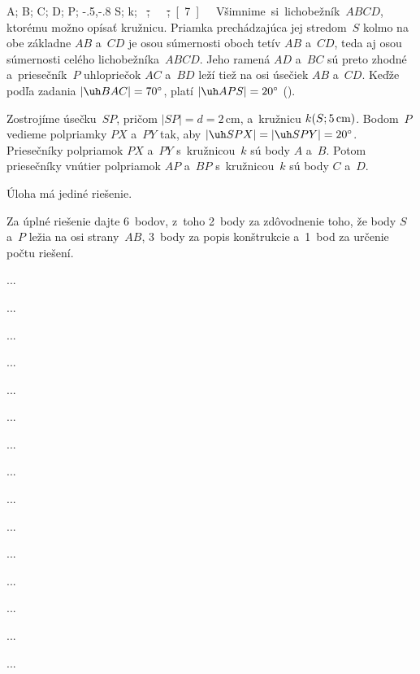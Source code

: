 {%
\fontplace
\trpoint A; \tlpoint B; \blpoint C; \brpoint D;
\lpoint P; \lpoint\xy-.5,-.8 S; \rBpoint k;
\cpoint\down\unit{}\st; \cpoint{}\st;
[7] \hfil\Obr

Všimnime si lichobežník~$ABCD$, ktorému možno opísať kružnicu. Priamka
prechádzajúca jej stredom~$S$ kolmo na obe základne $AB$ a~$CD$ je
osou súmernosti oboch tetív $AB$ a~$CD$, teda aj osou súmernosti
celého lichobežníka~$ABCD$. Jeho ramená $AD$ a~$BC$ sú preto
zhodné a~priesečník~$P$ uhlopriečok $AC$ a~$BD$ leží tiež na osi
úsečiek $AB$ a~$CD$. Keďže podľa zadania $|\uh BAC|=70^\circ$,
platí $|\uh APS|=20^\circ$ (\obr).
\inspicture{}

\konstrukcia
Zostrojíme úsečku~$SP$, pričom $|SP|=d=2$\,cm, a~kružnicu $k(S;
5\text{\,cm})$. Bodom~$P$ vedieme polpriamky $PX$ a~$PY$ tak, aby
$|\uh SPX|=|\uh SPY|=20^\circ$. Priesečníky polpriamok $PX$
a~$PY$ s~kružnicou~$k$ sú body $A$ a~$B$. Potom priesečníky vnútier
polpriamok $AP$ a~$BP$ s~kružnicou~$k$ sú body $C$ a~$D$.

Úloha má jediné riešenie.


\nobreak\medskip\petit\noindent
Za úplné riešenie dajte 6~bodov, z~toho 2~body za zdôvodnenie toho, že
body $S$ a~$P$ ležia na osi strany~$AB$, 3~body za popis
konštrukcie a~1~bod za určenie počtu riešení.
\endpetit}

{%
...}

{%
...}

{%
...}

{%
...}

{%
...}

{%
...}

{%
...}

{%
...}

{%
...}

{%
...}

{%
...}

{%
...}

{%
...}

{%
...}

{%
...}

